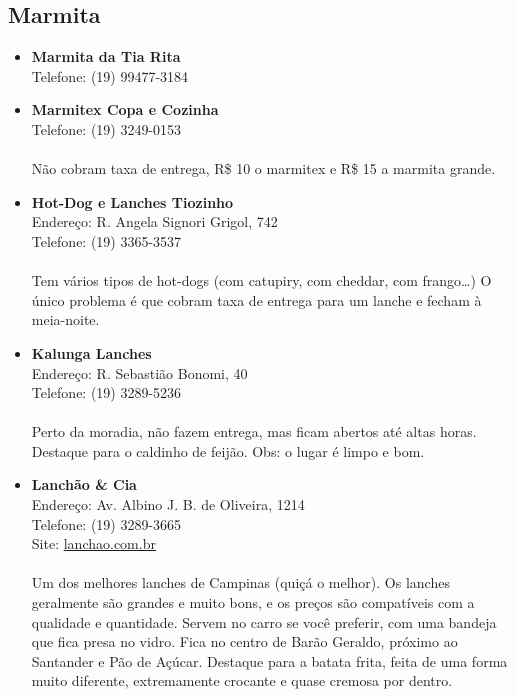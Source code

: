 \subsection{Marmita}

\begin{itemize}
\item \textbf{Marmita da Tia Rita}
  \\Telefone: (19) 99477-3184

\item \textbf{Marmitex Copa e Cozinha}
  \\Telefone: (19) 3249-0153
  \\
  \\Não cobram taxa de entrega, R\$ 10 o marmitex e R\$ 15 a marmita grande.

\item \textbf{Hot-Dog e Lanches Tiozinho}
  \\Endereço: R. Angela Signori Grigol, 742
  \\Telefone: (19) 3365-3537
  \\
  \\Tem vários tipos de hot-dogs (com catupiry, com cheddar, com frango{\dots})
  O único problema é que cobram taxa de entrega para um lanche e fecham à
  meia-noite.

\item \textbf{Kalunga Lanches}
  \\Endereço: R. Sebastião Bonomi, 40
  \\Telefone: (19) 3289-5236
  \\
  \\Perto da moradia, não fazem entrega, mas ficam abertos até altas horas.
  Destaque para o caldinho de feijão. Obs: o lugar é limpo e bom.

\item \textbf{Lanchão \& Cia}
  \\Endereço: Av. Albino J. B. de Oliveira, 1214
  \\Telefone: (19) 3289-3665
  \\Site: \url{lanchao.com.br}
  \\
  \\Um dos melhores lanches de Campinas (quiçá o melhor). Os lanches geralmente
  são grandes e muito bons, e os preços são compatíveis com a qualidade e
  quantidade. Servem no carro se você preferir, com uma bandeja que fica presa
  no vidro. Fica no centro de Barão Geraldo, próximo ao Santander e Pão de
  Açúcar. Destaque para a batata frita, feita de uma forma muito diferente,
  extremamente crocante e quase cremosa por dentro.


\end{itemize}
